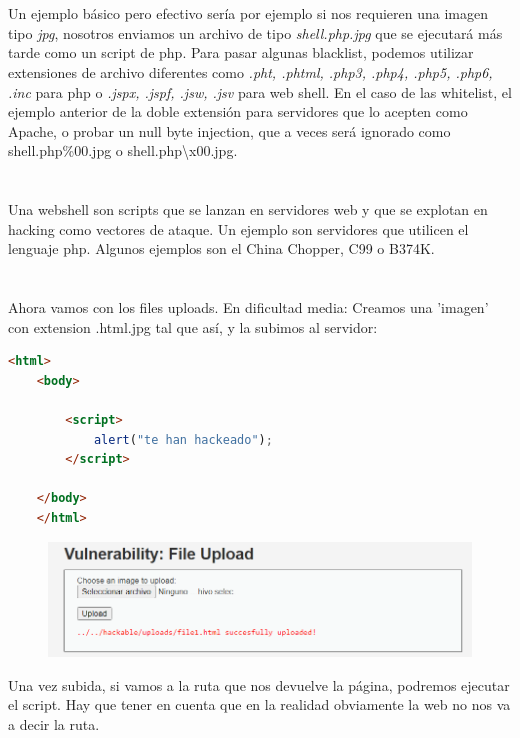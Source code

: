 \documentclass[12pt,a4paper,oneside,onecolumn]{article}
\begin{document}
    \section{}
    Un ejemplo b\'asico pero efectivo ser\'ia por ejemplo si nos requieren una imagen tipo \emph{jpg}, nosotros enviamos un archivo de tipo \emph{shell.php.jpg} que se ejecutar\'a m\'as tarde como un script de php.
    Para pasar algunas blacklist, podemos utilizar extensiones de archivo diferentes como \emph{.pht, .phtml, .php3, .php4, .php5, .php6, .inc} para php o \emph{.jspx, .jspf, .jsw, .jsv} para web shell.
    En el caso de las whitelist, el ejemplo anterior de la doble extensi\'on para servidores que lo acepten como Apache, o probar un null byte injection, que a veces ser\'a ignorado como shell.php\%00.jpg o shell.php\textbackslash x00.jpg.
    
    \section{}
    Una webshell son scripts que se lanzan en servidores web y que se explotan en hacking como vectores de ataque. Un ejemplo son servidores que utilicen el lenguaje php. Algunos ejemplos son el China Chopper, C99 o B374K.
	
	\section{}
	Ahora vamos con los files uploads. En dificultad media:
	Creamos una 'imagen' con extension .html.jpg tal que as\'i, y la subimos al servidor:
	\begin{lstlisting}[language = html]
    <html>
    <body>
    	
    	<script>
    		alert("te han hackeado");
    	</script>
    
    </body>
    </html>
    \end{lstlisting} 
    \begin{figure}[!h]
		\centering
		\includegraphics[scale=0.6]{fileUp2.png}
		\caption{}
		\label{fig:2}
	\end{figure}
	Una vez subida, si vamos a la ruta que nos devuelve la p\'agina, podremos ejecutar el script. Hay que tener en cuenta que en la realidad obviamente la web no nos va a decir la ruta.
    
\end{document}
